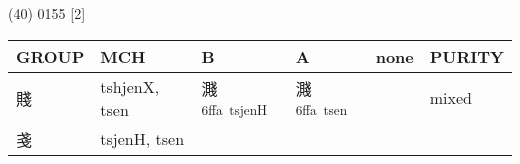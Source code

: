 \documentclass[14pt,a4paper]{scrartcl}
\begin{document}
(40) 0155 {[}2{]}

\begin{longtable}[c]{@{}llllll@{}}
\toprule
\begin{minipage}[b]{0.14\columnwidth}\raggedright\strut
GROUP
\strut\end{minipage} &
\begin{minipage}[b]{0.14\columnwidth}\raggedright\strut
MCH
\strut\end{minipage} &
\begin{minipage}[b]{0.14\columnwidth}\raggedright\strut
B
\strut\end{minipage} &
\begin{minipage}[b]{0.14\columnwidth}\raggedright\strut
A
\strut\end{minipage} &
\begin{minipage}[b]{0.14\columnwidth}\raggedright\strut
none
\strut\end{minipage} &
\begin{minipage}[b]{0.14\columnwidth}\raggedright\strut
PURITY
\strut\end{minipage}\tabularnewline
\midrule
\endhead
\begin{minipage}[t]{0.14\columnwidth}\raggedright\strut
賤
\strut\end{minipage} &
\begin{minipage}[t]{0.14\columnwidth}\raggedright\strut
tshjenX, tsen
\strut\end{minipage} &
\begin{minipage}[t]{0.14\columnwidth}\raggedright\strut
濺\textsuperscript{6ffa~tsjenH}
\strut\end{minipage} &
\begin{minipage}[t]{0.14\columnwidth}\raggedright\strut
濺\textsuperscript{6ffa~tsen}
\strut\end{minipage} &
\begin{minipage}[t]{0.14\columnwidth}\raggedright\strut
\strut\end{minipage} &
\begin{minipage}[t]{0.14\columnwidth}\raggedright\strut
mixed
\strut\end{minipage}\tabularnewline
\begin{minipage}[t]{0.14\columnwidth}\raggedright\strut
戔
\strut\end{minipage} &
\begin{minipage}[t]{0.14\columnwidth}\raggedright\strut
tsjenH, tsen
\strut\end{minipage} &
\begin{minipage}[t]{0.14\columnwidth}\raggedright\strut

\end{minipage}
\end{longtable}
\end{document}
